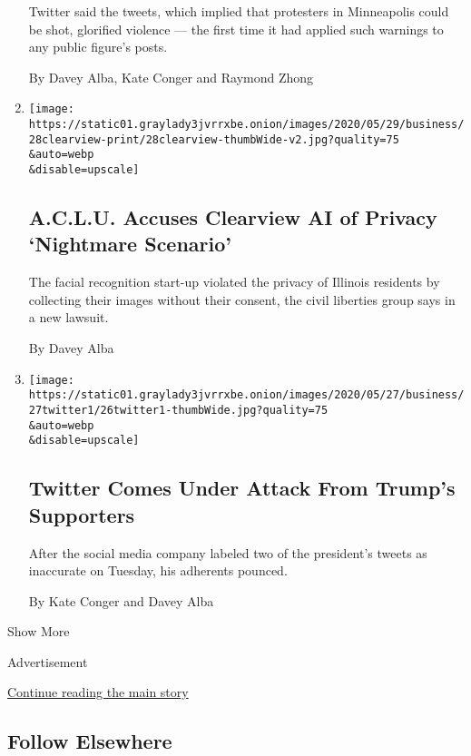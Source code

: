 \begin{enumerate}
  Twitter said the tweets, which implied that protesters in Minneapolis
  could be shot, glorified violence --- the first time it had applied
  such warnings to any public figure's posts.

  By Davey Alba, Kate Conger and Raymond Zhong
\item
  \href{/2020/05/28/technology/clearview-ai-privacy-lawsuit.html}{}

  \texttt{[image: https://static01.graylady3jvrrxbe.onion/images/2020/05/29/business/28clearview-print/28clearview-thumbWide-v2.jpg?quality=75\\\&auto=webp\\\&disable=upscale]}

  \hypertarget{aclu-accuses-clearview-ai-of-privacy-nightmare-scenario}{%
  \subsection{A.C.L.U. Accuses Clearview AI of Privacy `Nightmare
  Scenario'}\label{aclu-accuses-clearview-ai-of-privacy-nightmare-scenario}}

  The facial recognition start-up violated the privacy of Illinois
  residents by collecting their images without their consent, the civil
  liberties group says in a new lawsuit.

  By Davey Alba
\item
  \href{/2020/05/27/technology/trump-twitter.html}{}

  \texttt{[image: https://static01.graylady3jvrrxbe.onion/images/2020/05/27/business/27twitter1/26twitter1-thumbWide.jpg?quality=75\\\&auto=webp\\\&disable=upscale]}

  \hypertarget{twitter-comes-under-attack-from-trumps-supporters}{%
  \subsection{Twitter Comes Under Attack From Trump's
  Supporters}\label{twitter-comes-under-attack-from-trumps-supporters}}

  After the social media company labeled two of the president's tweets
  as inaccurate on Tuesday, his adherents pounced.

  By Kate Conger and Davey Alba
\end{enumerate}

Show More

Advertisement

\protect\hyperlink{after-mid2}{Continue reading the main story}

\hypertarget{follow-elsewhere}{%
\subsection{Follow Elsewhere}\label{follow-elsewhere}}

